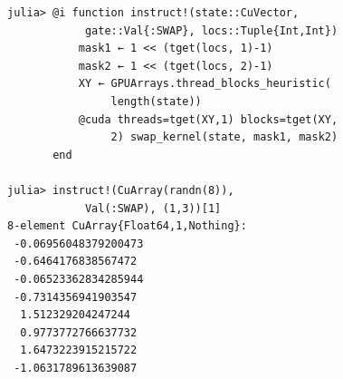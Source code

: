 \documentclass[aps,twocolumn,longbibliography,english,superscriptaddress]{revtex4-1}
\newcommand{\<}{\langle}
\renewcommand{\>}{\rangle}
\theoremstyle{definition}\newtheorem{definition}{\textit{Definition}}
\begin{document}
\begin{minipage}{.44\textwidth}
\begin{lstlisting}
julia> @i function instruct!(state::CuVector,
            gate::Val{:SWAP}, locs::Tuple{Int,Int})
           mask1 ← 1 << (tget(locs, 1)-1)
           mask2 ← 1 << (tget(locs, 2)-1)
           XY ← GPUArrays.thread_blocks_heuristic(
                length(state))
           @cuda threads=tget(XY,1) blocks=tget(XY,
                2) swap_kernel(state, mask1, mask2)
       end

julia> instruct!(CuArray(randn(8)),
            Val(:SWAP), (1,3))[1]
8-element CuArray{Float64,1,Nothing}:
 -0.06956048379200473
 -0.6464176838567472
 -0.06523362834285944
 -0.7314356941903547
  1.512329204247244
  0.9773772766637732
  1.6473223915215722
 -1.0631789613639087
\end{lstlisting}
\end{minipage}
\end{document}
